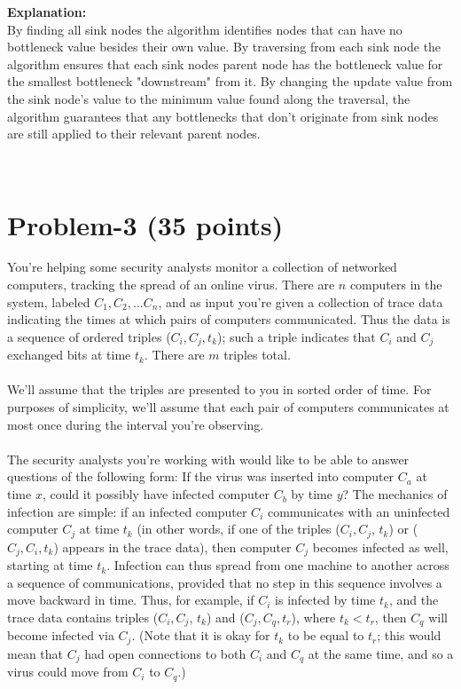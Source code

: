 \documentclass[11pt]{article}
\begin{document}
\noindent \textbf{Explanation:}\\
By finding all sink nodes the algorithm identifies nodes that can have no bottleneck value besides their own value. By traversing from each sink node the algorithm ensures that each sink nodes parent node has the bottleneck value for the smallest bottleneck "downstream" from it. By changing the update value from the sink node's value to the minimum value found along the traversal, the algorithm guarantees that any bottlenecks that don't originate from sink nodes are still applied to their relevant parent nodes.

​
\newpage
\section*{Problem-3 (35 points)}
\noindent
You're helping some security analysts monitor a collection of networked
computers, tracking the spread of an online virus. There are $n$ computers in the system, labeled $C_1, C_2, ... C_n$, and as input you're given a collection of trace data indicating the times at which pairs of computers communicated. Thus the data is a sequence of ordered triples ($C_i, C_j, t_k$); such a triple indicates that $C_i$ and $C_j$ exchanged bits at time $t_k$. There are $m$ triples total.  \\ \\ \noindent
We'll assume that the triples are presented to you in sorted order of time. For purposes of simplicity, we'll assume that each pair of computers communicates at most once during the interval you're observing. \\ \\ \noindent
The security analysts you're working with would like to be able to answer questions of the following form: If the virus was inserted into computer $C_a$ at time $x$, could it possibly have infected computer $C_b$ by time $y$? The mechanics of infection are simple: if an infected computer $C_i$ communicates with an uninfected computer $C_j$ at time $t_k$ (in other words, if one of the triples ($C_i, C_j$, $t_k$) or ($C_j,C_i, t_k$) appears in the trace data), then computer $C_j$ becomes infected as well, starting at time $t_k$. Infection can thus spread from one machine to another across a sequence of communications, provided that no step in this sequence involves a move backward in time. Thus, for example, if $C_i$ is infected by time $t_k$, and the trace data contains triples ($C_i, C_j$, $t_k$) and ($C_j,C_q, t_r$), where $t_k < t_r$, then $C_q$ will become infected via $C_j$. (Note that it is okay for $t_k$ to be equal to $t_r$; this would mean that $C_j$ had open connections to both $C_i$ and $C_q$ at the same time, and so a virus could move from $C_i$ to $C_q$.)  \\ \\ \noindent
\end{document}
